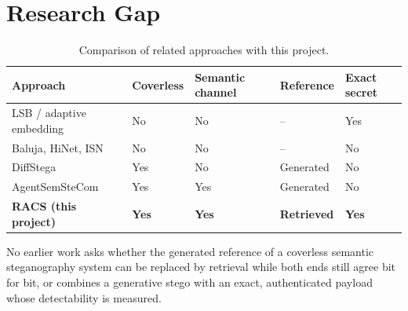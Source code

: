 \section{Research Gap}
\begin{table}[H]
	\centering
	\caption{Comparison of related approaches with this project.}
	\label{tab:litgap}
	\begin{tabularx}{\textwidth}{|X|>{\centering\arraybackslash}p{1.6cm}|>{\centering\arraybackslash}p{1.7cm}|>{\centering\arraybackslash}p{1.8cm}|>{\centering\arraybackslash}p{1.4cm}|}
		\hline
		\textbf{Approach} & \textbf{Coverless} & \textbf{Semantic channel} & \textbf{Reference} & \textbf{Exact secret} \\ \hline
		LSB / adaptive embedding & No & No & -- & Yes \\ \hline
		Baluja, HiNet, ISN & No & No & -- & No \\ \hline
		DiffStega & Yes & No & Generated & No \\ \hline
		AgentSemSteCom & Yes & Yes & Generated & No \\ \hline
		\textbf{RACS (this project)} & \textbf{Yes} & \textbf{Yes} & \textbf{Retrieved} & \textbf{Yes} \\ \hline
	\end{tabularx}
\end{table}

No earlier work asks whether the generated reference of a coverless semantic steganography
system can be replaced by retrieval while both ends still agree bit for bit, or combines a
generative stego with an exact, authenticated payload whose detectability is measured.
